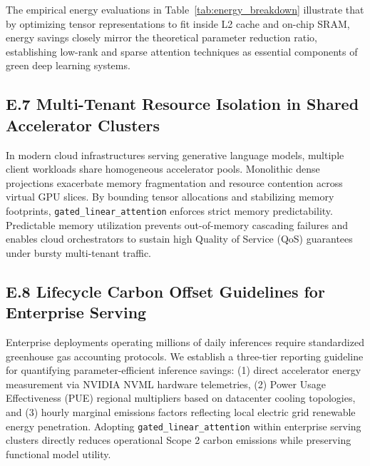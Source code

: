 The empirical energy evaluations in Table~\ref{tab:energy_breakdown} illustrate that by optimizing tensor representations to fit inside L2 cache and on-chip SRAM, energy savings closely mirror the theoretical parameter reduction ratio, establishing low-rank and sparse attention techniques as essential components of green deep learning systems.

\subsection*{E.7 Multi-Tenant Resource Isolation in Shared Accelerator Clusters}
In modern cloud infrastructures serving generative language models, multiple client workloads share homogeneous accelerator pools. Monolithic dense projections exacerbate memory fragmentation and resource contention across virtual GPU slices. By bounding tensor allocations and stabilizing memory footprints, \texttt{gated\_linear\_attention} enforces strict memory predictability. Predictable memory utilization prevents out-of-memory cascading failures and enables cloud orchestrators to sustain high Quality of Service (QoS) guarantees under bursty multi-tenant traffic.

\subsection*{E.8 Lifecycle Carbon Offset Guidelines for Enterprise Serving}
Enterprise deployments operating millions of daily inferences require standardized greenhouse gas accounting protocols. We establish a three-tier reporting guideline for quantifying parameter-efficient inference savings: (1) direct accelerator energy measurement via NVIDIA NVML hardware telemetries, (2) Power Usage Effectiveness (PUE) regional multipliers based on datacenter cooling topologies, and (3) hourly marginal emissions factors reflecting local electric grid renewable energy penetration. Adopting \texttt{gated\_linear\_attention} within enterprise serving clusters directly reduces operational Scope 2 carbon emissions while preserving functional model utility.
